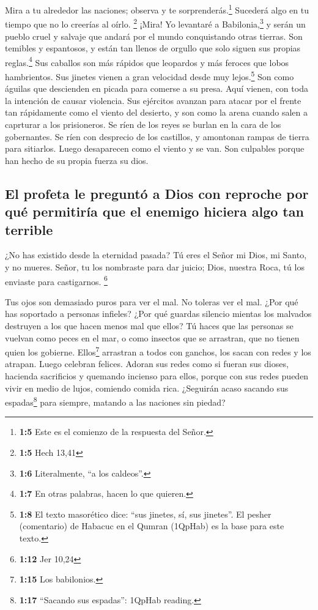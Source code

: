  Mira a tu alrededor las naciones; observa y te
sorprenderás.\footnote{\textbf{1:5} Este es el comienzo de la respuesta
  del Señor.} Sucederá algo en tu tiempo que no lo creerías al oírlo.
\footnote{\textbf{1:5} Hech 13,41}  ¡Mira! Yo levantaré a
Babilonia,\footnote{\textbf{1:6} Literalmente, ``a los caldeos''.} y
serán un pueblo cruel y salvaje que andará por el mundo conquistando
otras tierras.  Son temibles y espantosos, y están tan
llenos de orgullo que solo siguen sus propias reglas.\footnote{\textbf{1:7}
  En otras palabras, hacen lo que quieren.}  Sus caballos
son más rápidos que leopardos y más feroces que lobos hambrientos. Sus
jinetes vienen a gran velocidad desde muy lejos.\footnote{\textbf{1:8}
  El texto masorético dice: ``sus jinetes, sí, sus jinetes''. El pesher
  (comentario) de Habacuc en el Qumran (1QpHab) es la base para este
  texto.} Son como águilas que descienden en picada para comerse a su
presa.  Aquí vienen, con toda la intención de causar
violencia. Sus ejércitos avanzan para atacar por el frente tan
rápidamente como el viento del desierto, y son como la arena cuando
salen a caprturar a los prisioneros.  Se ríen de los
reyes se burlan en la cara de los gobernantes. Se ríen con desprecio de
los castillos, y amontonan rampas de tierra para sitiarlos.
 Luego desaparecen como el viento y se van. Son culpables
porque han hecho de su propia fuerza su dios.

\hypertarget{el-profeta-le-preguntuxf3-a-dios-con-reproche-por-quuxe9-permitiruxeda-que-el-enemigo-hiciera-algo-tan-terrible}{%
\subsection{El profeta le preguntó a Dios con reproche por qué
permitiría que el enemigo hiciera algo tan
terrible}\label{el-profeta-le-preguntuxf3-a-dios-con-reproche-por-quuxe9-permitiruxeda-que-el-enemigo-hiciera-algo-tan-terrible}}

 ¿No has existido desde la eternidad pasada? Tú eres el
Señor mi Dios, mi Santo, y no mueres. Señor, tu los nombraste para dar
juicio; Dios, nuestra Roca, tú los enviaste para castigarnos.
\footnote{\textbf{1:12} Jer 10,24}

 Tus ojos son demasiado puros para ver el mal. No toleras
ver el mal. ¿Por qué has soportado a personas infieles? ¿Por qué guardas
silencio mientas los malvados destruyen a los que hacen menos mal que
ellos?  Tú haces que las personas se vuelvan como peces
en el mar, o como insectos que se arrastran, que no tienen quien los
gobierne.  Ellos\footnote{\textbf{1:15} Los babilonios.}
arrastran a todos con ganchos, los sacan con redes y los atrapan. Luego
celebran felices.  Adoran sus redes como si fueran sus
dioses, hacienda sacrificios y quemando incienso para ellos, porque con
sus redes pueden vivir en medio de lujos, comiendo comida rica.
 ¿Seguirán acaso sacando sus espadas\footnote{\textbf{1:17}
  ``Sacando sus espadas'': 1QpHab reading.} para siempre, matando a las
naciones sin piedad?

